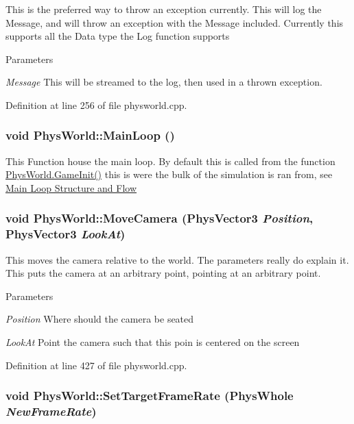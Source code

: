 This is the preferred way to throw an exception currently. This will log the Message, and will throw an exception with the Message included. Currently this supports all the Data type the Log function supports 
\begin{DoxyParams}{Parameters}
\item[{\em Message}]This will be streamed to the log, then used in a thrown exception. \end{DoxyParams}


Definition at line 256 of file physworld.cpp.\hypertarget{classPhysWorld_ad41cad0347b6f5ba7ec05568aaffa514}{
\subsubsection[{MainLoop}]{\setlength{\rightskip}{0pt plus 5cm}void PhysWorld::MainLoop ()}}
\label{db/df5/classPhysWorld_ad41cad0347b6f5ba7ec05568aaffa514}


This Function house the main loop. By default this is called from the function \hyperlink{classPhysWorld_afc5116f97cc1e91e899d1a1ca7e14e9b}{PhysWorld.GameInit()} this is were the bulk of the simulation is ran from, see \hyperlink{mainloop1}{Main Loop Structure and Flow} \hypertarget{classPhysWorld_a1df24ee06d5881825902b60e0d81174a}{
\subsubsection[{MoveCamera}]{\setlength{\rightskip}{0pt plus 5cm}void PhysWorld::MoveCamera ({\bf PhysVector3} {\em Position}, \/  {\bf PhysVector3} {\em LookAt})}}
\label{db/df5/classPhysWorld_a1df24ee06d5881825902b60e0d81174a}


This moves the camera relative to the world. The parameters really do explain it. This puts the camera at an arbitrary point, pointing at an arbitrary point. 
\begin{DoxyParams}{Parameters}
\item[{\em Position}]Where should the camera be seated \item[{\em LookAt}]Point the camera such that this poin is centered on the screen \end{DoxyParams}


Definition at line 427 of file physworld.cpp.\hypertarget{classPhysWorld_af68a05d6ee84d901bb3ed0e175daa662}{
\subsubsection[{SetTargetFrameRate}]{\setlength{\rightskip}{0pt plus 5cm}void PhysWorld::SetTargetFrameRate (PhysWhole {\em NewFrameRate})}}
\label{db/df5/classPhysWorld_af68a05d6ee84d901bb3ed0e175daa662}


